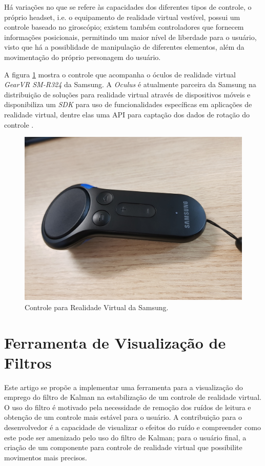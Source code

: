 \documentclass[conference]{IEEEtran}
\begin{document}
Há variações no que se refere às capacidades dos diferentes tipos de controle, o próprio headset, i.e. o equipamento de realidade virtual vestível, possui um controle baseado no giroscópio; existem também controladores que fornecem informações posicionais, permitindo um maior nível de liberdade para o usuário, visto que há a possiblidade de manipulação de diferentes elementos, além da movimentação do próprio personagem do usuário.

A figura \ref{figure:vrcontroller} mostra o controle que acompanha o óculos de realidade virtual \textit{GearVR SM-R324} da Samsung. A \textit{Oculus} é atualmente parceira da Samsung na distribuição de soluções para realidade virtual através de dispositivos móveis e disponibiliza um \textit{SDK} para uso de funcionalidades específicas em aplicações de realidade virtual, dentre elas uma API para captação dos dados de rotação do controle \cite{gearvrinputdocs}.

\begin{figure}[h!]
\includegraphics[width=\linewidth]{images/gear_controller.jpg}
\caption{Controle para Realidade Virtual da Samsung.}
\label{figure:vrcontroller}
\end{figure}

\section{Ferramenta de Visualização de Filtros} \label{sec:viztool}

Este artigo se propõe a implementar uma ferramenta para a visualização do emprego do filtro de Kalman na estabilização de um controle de realidade virtual. O uso do filtro é motivado pela necessidade de remoção dos ruídos de leitura e obtenção de um controle mais estável para o usuário. A contribuição para o desenvolvedor é a capacidade de visualizar o efeitos do ruído e compreender como este pode ser amenizado pelo uso do filtro de Kalman; para o usuário final, a criação de um componente para controle de realidade virtual que possibilite movimentos mais precisos.
\end{document}
